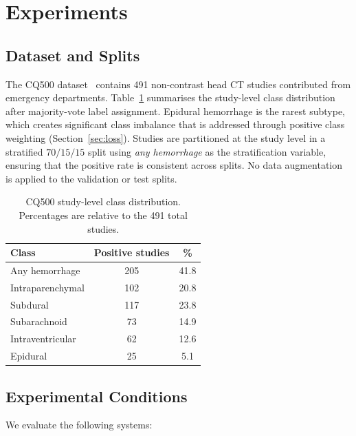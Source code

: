 \section{Experiments}
\label{sec:experiments}

\subsection{Dataset and Splits}

The CQ500 dataset~\cite{chilamkurthy2018cq500} contains 491 non-contrast
head CT studies contributed from emergency departments.
Table~\ref{tab:dataset} summarises the study-level class distribution after
majority-vote label assignment.
Epidural hemorrhage is the rarest subtype, which creates significant class
imbalance that is addressed through positive class weighting
(Section~\ref{sec:loss}).
Studies are partitioned at the study level in a stratified $70/15/15$ split
using \emph{any hemorrhage} as the stratification variable, ensuring that the
positive rate is consistent across splits.
No data augmentation is applied to the validation or test splits.

\begin{table}[t]
    \centering
    \caption{CQ500 study-level class distribution. Percentages are relative
             to the 491 total studies.}
    \label{tab:dataset}
    \begin{tabular}{lcc}
        \toprule
        \textbf{Class} & \textbf{Positive studies} & \textbf{\%} \\
        \midrule
        Any hemorrhage      & 205 & 41.8 \\
        Intraparenchymal    & 102 & 20.8 \\
        Subdural            & 117 & 23.8 \\
        Subarachnoid        &  73 & 14.9 \\
        Intraventricular    &  62 & 12.6 \\
        Epidural            &  25 &  5.1 \\
        \bottomrule
    \end{tabular}
\end{table}

\subsection{Experimental Conditions}
\label{sec:conditions}

We evaluate the following systems:

